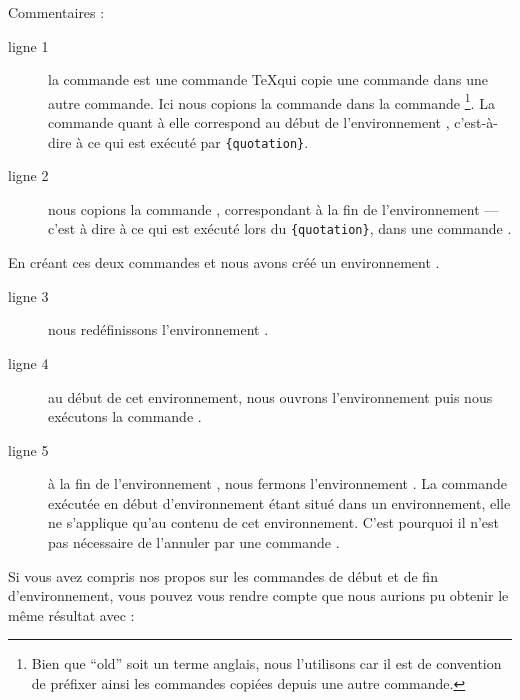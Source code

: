 Commentaires : 

\begin{description}
\item[ligne 1] la commande  est une commande \TeX qui copie une commande dans une autre commande. Ici nous copions la commande  dans la commande \footnote{Bien que \enquote{old} soit un terme anglais, nous l'utilisons car il est de convention de préfixer ainsi les commandes copiées depuis une autre commande.}. La commande  quant à elle correspond au début de l'environnement , c'est-à-dire à ce qui est exécuté par \verb|{quotation}|.
\item[ligne 2] nous copions la commande , correspondant à la fin de l'environnement   --- c'est à dire à ce qui est exécuté lors du \verb|{quotation}|, dans une commande .
\end{description}

En créant ces deux commandes  et  nous avons créé un environnement .

\begin{description}
\item[ligne 3]nous redéfinissons l'environnement .
\item[ligne 4]au début de cet environnement, nous ouvrons l'environnement  puis nous exécutons la commande .
\item[ligne 5]à la fin de l'environnement , nous fermons l'environnement . La commande  exécutée en début d'environnement étant situé dans un environnement, elle ne s'applique qu'au contenu de cet environnement. C'est pourquoi il n'est pas nécessaire de l'annuler par une commande . 
\end{description}

\begin{plusloins}
Si vous avez compris nos propos sur les commandes de début et de fin d'environnement, vous pouvez vous rendre compte que nous aurions pu obtenir le même résultat avec :

\begin{latexcode}
\let\endoldquotation\endquotation
\renewcommand{\quotation}{\oldquotation\singlespace}
\end{latexcode}

\end{plusloins}

